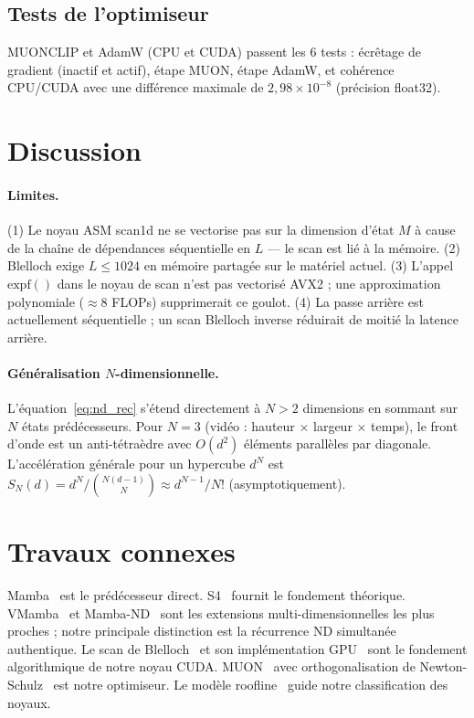 \documentclass[10pt,onecolumn]{article}
\begin{document}
\subsection{Tests de l'optimiseur}

MUONCLIP et AdamW (CPU et CUDA) passent les 6 tests :
écrêtage de gradient (inactif et actif), étape MUON, étape AdamW,
et cohérence CPU/CUDA avec une différence maximale de $2,98 \times 10^{-8}$
(précision float32).

\section{Discussion}

\paragraph{Limites.}
(1) Le noyau ASM scan1d ne se vectorise pas sur la dimension d'état $M$
à cause de la chaîne de dépendances séquentielle en $L$ — le scan est lié à la mémoire.
(2) Blelloch exige $L \leq 1024$ en mémoire partagée sur le matériel actuel.
(3) L'appel $\text{expf}()$ dans le noyau de scan n'est pas vectorisé AVX2 ;
une approximation polynomiale ($\approx 8$ FLOPs) supprimerait ce goulot.
(4) La passe arrière est actuellement séquentielle ; un scan Blelloch inverse
réduirait de moitié la latence arrière.

\paragraph{Généralisation $N$-dimensionnelle.}
L'équation~\eqref{eq:nd_rec} s'étend directement à $N > 2$ dimensions
en sommant sur $N$ états prédécesseurs.
Pour $N = 3$ (vidéo : hauteur × largeur × temps), le front d'onde est
un anti-tétraèdre avec $O(d^2)$ éléments parallèles par diagonale.
L'accélération générale pour un hypercube $d^N$ est
$S_N(d) = d^N / \binom{N(d-1)}{N} \approx d^{N-1}/N!$
(asymptotiquement).

\section{Travaux connexes}

Mamba~\cite{mamba2023} est le prédécesseur direct.
S4~\cite{s4} fournit le fondement théorique.
VMamba~\cite{vmamba} et Mamba-ND~\cite{mamband} sont les extensions
multi-dimensionnelles les plus proches ; notre principale distinction est la
récurrence ND simultanée authentique.
Le scan de Blelloch~\cite{blelloch1990} et son implémentation GPU~\cite{harris2007gpu}
sont le fondement algorithmique de notre noyau CUDA.
MUON~\cite{muon2025} avec orthogonalisation de Newton-Schulz~\cite{bjorck1971}
est notre optimiseur.
Le modèle roofline~\cite{williams2009roofline} guide notre classification des noyaux.
\end{document}
